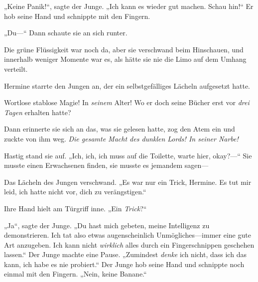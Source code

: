 „Keine Panik!“, sagte der Junge. „Ich kann es wieder gut machen. Schau hin!“ Er hob seine Hand und schnippte mit den Fingern.

„Du—“ Dann schaute sie an sich runter.

Die grüne Flüssigkeit war noch da, aber sie verschwand beim Hinschauen, und innerhalb weniger Momente war es, als hätte sie nie die Limo auf dem Umhang verteilt.

Hermine starrte den Jungen an, der ein selbstgefälliges Lächeln aufgesetzt hatte.

Wortlose stablose Magie! In \emph{seinem} Alter! Wo er doch seine Bücher erst vor \emph{drei Tagen} erhalten hatte?

Dann erinnerte sie sich an das, was sie gelesen hatte, zog den Atem ein und zuckte von ihm weg. \emph{Die gesamte Macht des dunklen Lords! In seiner Narbe!}

Hastig stand sie auf. „Ich, ich, ich muss auf die Toilette, warte hier, okay?—“ Sie musste einen Erwachsenen finden, sie musste es jemandem sagen—

Das Lächeln des Jungen verschwand. „Es war nur ein Trick, Hermine. Es tut mir leid, ich hatte nicht vor, dich zu verängstigen.“

Ihre Hand hielt am Türgriff inne. „Ein \emph{Trick}?“

„Ja“, sagte der Junge. „Du hast mich gebeten, meine Intelligenz zu demonstrieren. Ich tat also etwas augenscheinlich Unmögliches—immer eine gute Art anzugeben. Ich kann nicht \emph{wirklich} alles durch ein Fingerschnippen geschehen lassen.“ Der Junge machte eine Pause. „Zumindest \emph{denke} ich nicht, dass ich das kann, ich habe es nie probiert.“ Der Junge hob seine Hand und schnippte noch einmal mit den Fingern. „Nein, keine Banane.“

